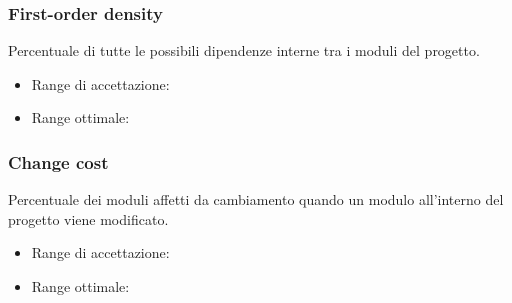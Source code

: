 \documentclass[a4paper,11pt]{article}
\begin{document}


\subsubsection{First-order density}
Percentuale di tutte le possibili dipendenze interne tra i moduli del progetto. 
\begin{itemize}
	\item Range di accettazione: \begin{math}[\le 20\%]\end{math}
	\item Range ottimale: \begin{math}[\le 15\%]\end{math}
	\end{itemize}
\subsubsection{Change cost}
Percentuale dei moduli affetti da cambiamento quando un modulo all'interno del progetto viene modificato.
\begin{itemize}
	\item Range di accettazione: \begin{math}[\le 50\%]\end{math}
	\item Range ottimale: \begin{math}[\le 40\%]\end{math}
	\end{itemize}
\end{document}
